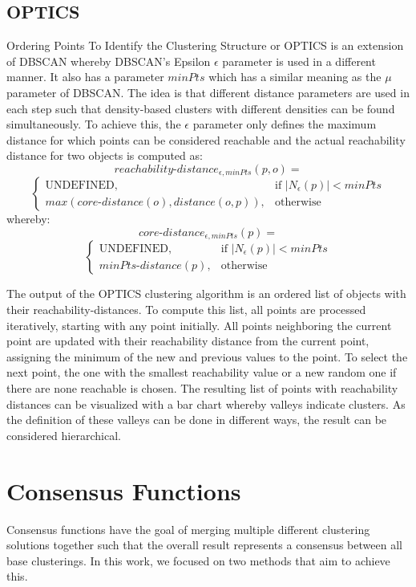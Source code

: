 \documentclass[
	a4paper,
	english,
	twoside,
	openright,               
	11pt                            
	]{report}
\begin{document}
\subsection{OPTICS}\label{sec:opticstheory}
Ordering Points To Identify the Clustering Structure or OPTICS \cite{10.1145/304181.304187} is an extension of DBSCAN whereby DBSCAN's Epsilon $\epsilon$ parameter is used in a different manner. It also has a parameter $minPts$ which has a similar meaning as the $\mu$ parameter of DBSCAN. The idea is that different distance parameters are used in each step such that density-based clusters with different densities can be found simultaneously. To achieve this, the  $\epsilon$ parameter only defines the maximum distance for which points can be considered reachable and the actual reachability distance for two objects is computed as:
$$reachability\text{-}distance_{\epsilon,minPts}(p,o)=$$
$$
\begin{cases}
    \text{UNDEFINED},& \text{if } |N_\epsilon(p)|< minPts\\
    max(core\text{-}distance(o),distance(o,p)),              & \text{otherwise}
\end{cases}
$$
whereby:
$$core\text{-}distance_{\epsilon,minPts}(p)=$$
$$
\begin{cases}
    \text{UNDEFINED},& \text{if } |N_\epsilon(p)|< minPts\\
    minPts\text{-}distance(p),              & \text{otherwise}
\end{cases}
$$

The output of the OPTICS clustering algorithm is an ordered list of objects with their reachability-distances. To compute this list, all points are processed iteratively, starting with any point initially. All points neighboring the current point are updated with their reachability distance from the current point, assigning the minimum of the new and previous values to the point. To select the next point, the one with the smallest reachability value or a new random one if there are none reachable is chosen. The resulting list of points with reachability distances can be visualized with a bar chart whereby valleys indicate clusters. As the definition of these valleys can be done in different ways, the result can be considered hierarchical.


\section{Consensus Functions}
Consensus functions have the goal of merging multiple different clustering solutions together such that the overall result represents a consensus between all base clusterings. In this work, we focused on two methods that aim to achieve this.
\end{document}
